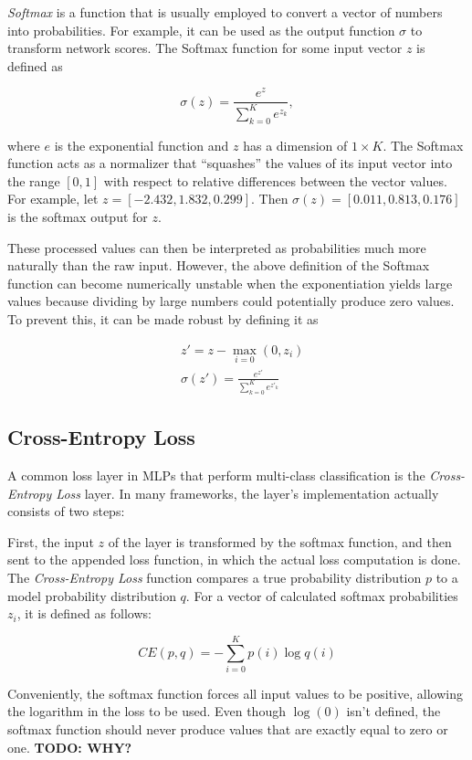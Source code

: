 \textit{Softmax} is a function that is usually employed to convert a vector of numbers into probabilities. For example, it can be used as the output function $\sigma$ to transform network scores. The Softmax function for some input vector $z$ is defined as

\[\sigma(z) = \frac{e^{z}}{\sum_{k=0}^{K} e^{z_k}},\]

\noindent where $e$ is the exponential function and $z$ has a dimension of $1 \times K$. The Softmax function acts as a normalizer that ``squashes'' the values of its input vector into the range $[0, 1]$ with respect to relative differences between the vector values. For example, let $z = [-2.432, 1.832, 0.299]$. Then $\sigma(z) = [0.011, 0.813, 0.176]$ is the softmax output for $z$.

These processed values can then be interpreted as probabilities much more naturally than the raw input. However, the above definition of the Softmax function can become numerically unstable when the exponentiation yields large values because dividing by large numbers could potentially produce zero values. To prevent this, it can be made robust by defining it as

\begin {align}
	&z' = z - \max \limits_{i = 0}(0, z_i)\\
	&\sigma(z') = \frac{e^{z'}}{\sum_{k=0}^{K} e^{z'_{{k}}}}
\end {align}


		\subsection{Cross-Entropy Loss}
\label{subsec:cross_ent}

A common loss layer in MLPs that perform multi-class classification is the \textit{Cross-Entropy Loss} layer. In many frameworks, the layer's implementation actually consists of two steps:

First, the input $z$ of the layer is transformed by the softmax function, and then sent to the appended loss function, in which the actual loss computation is done. The \textit{Cross-Entropy Loss} function compares a true probability distribution $p$ to a model probability distribution $q$. For a vector of calculated softmax probabilities $z_i$, it is defined as follows:

\[CE(p, q) = -\sum \limits_{i = 0}^{K} p(i) \log q(i)\]

\noindent Conveniently, the softmax function forces all input values to be positive, allowing the logarithm in the loss to be used. Even though $\log (0)$ isn't defined, the softmax function should never produce values that are exactly equal to zero or one. \textbf{TODO: WHY?} 


